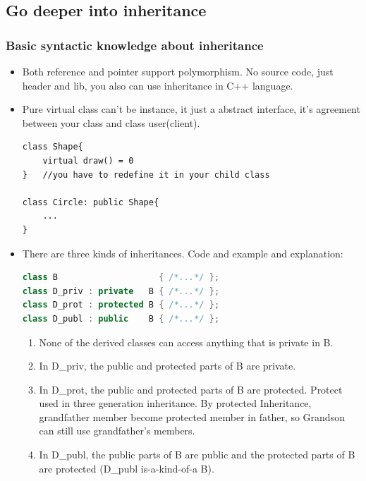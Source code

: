 \documentclass[a4paper,11pt,twoside]{book}
\begin{document}
\subsection{Go deeper into inheritance}

\subsubsection{Basic syntactic knowledge about inheritance}

	\begin{itemize}
	
		\item Both reference and pointer support polymorphism. No source code, just header and lib, you also can use inheritance in C++ language.
		
		\item Pure virtual class can't be instance, it just a abstract interface, it's agreement between your class and class user(client).
\begin{lstlisting}[numbers=none]
class Shape{
	virtual draw() = 0 
}	//you have to redefine it in your child class
			
class Circle: public Shape{
	...
}
\end{lstlisting}
			
	\item 	There are three kinds of inheritances. Code and example and explanation:
\begin{lstlisting}[frame=single, language=c++]
class B                    { /*...*/ };
class D_priv : private   B { /*...*/ };
class D_prot : protected B { /*...*/ };
class D_publ : public    B { /*...*/ };
\end{lstlisting}
	
	\begin{enumerate}
		\item None of the derived classes can access anything that is private in B.
		
		\item In D\_priv, the public and protected parts of B are private.
		
		\item In D\_prot, the public and protected parts of B are protected. Protect used in three generation inheritance. By protected Inheritance, grandfather member become protected member in father, so Grandson can still use grandfather's members.
		
		\item In D\_publ, the public parts of  B are public and the protected parts of B are protected (D\_publ is-a-kind-of-a B).
		

\end{enumerate}
\end{itemize}
\end{document}
